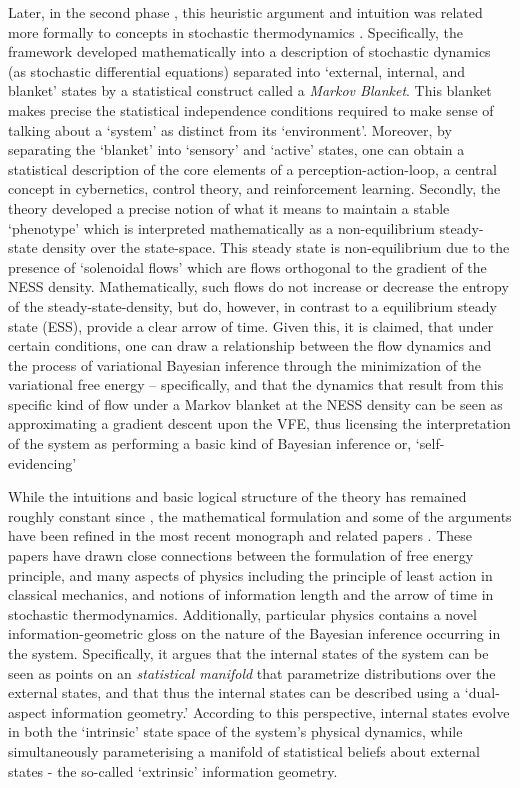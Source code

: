 Later, in the second phase \citep{friston2013life}, this heuristic argument and intuition was related more formally to concepts in stochastic thermodynamics \citep{friston2012ao,friston2012free}. Specifically, the framework developed mathematically into a description of stochastic dynamics (as stochastic differential equations) separated into `external, internal, and blanket' states by a statistical construct called a \emph{Markov Blanket}. This blanket makes precise the statistical independence conditions required to make sense of talking about a `system' as distinct from its `environment'. Moreover, by separating the `blanket' into `sensory' and `active' states, one can obtain a statistical description of the core elements of a perception-action-loop, a central concept in cybernetics, control theory, and reinforcement learning. Secondly, the theory developed a precise notion of what it means to maintain a stable `phenotype' which is interpreted mathematically  as a non-equilibrium steady-state density over the state-space. This steady state is non-equilibrium due to the presence of `solenoidal flows' which are flows orthogonal to the gradient of the NESS density. Mathematically, such flows do not increase or decrease the entropy of the steady-state-density, but do, however, in contrast to a equilibrium steady state (ESS), provide a clear arrow of time. Given this, it is claimed, that under certain conditions, one can draw a relationship between the flow dynamics and the process of variational Bayesian inference through the minimization of the variational free energy -- specifically, and that the dynamics that result from this specific kind of flow under a Markov blanket at the NESS density can be seen as approximating a gradient descent upon the VFE, thus licensing the interpretation of the system as performing a basic kind of Bayesian inference or, `self-evidencing' \citep{hohwy2008predictive,clark2015surfing}

While the intuitions and basic logical structure of the theory has remained roughly constant since \citet{friston2013life,friston2012free}, the mathematical formulation and some of the arguments have been refined in the most recent \citet{friston2019particularphysics} monograph and related papers \citep{friston2020some,parr2020markov}. These papers have drawn close connections between the formulation of free energy principle, and many aspects of physics including the principle of least action in classical mechanics, and notions of information length and the arrow of time in stochastic thermodynamics. Additionally, particular physics contains a novel information-geometric gloss on the nature of the Bayesian inference occurring in the system. Specifically, it argues that the internal states of the system can be seen as points on an \emph{statistical manifold} that parametrize distributions over the external states, and that thus the internal states can be described using a `dual-aspect information geometry.' According to this perspective, internal states evolve in both the `intrinsic' state space of the system's physical dynamics, while simultaneously parameterising a manifold of statistical beliefs about external states - the so-called `extrinsic' information geometry. 


